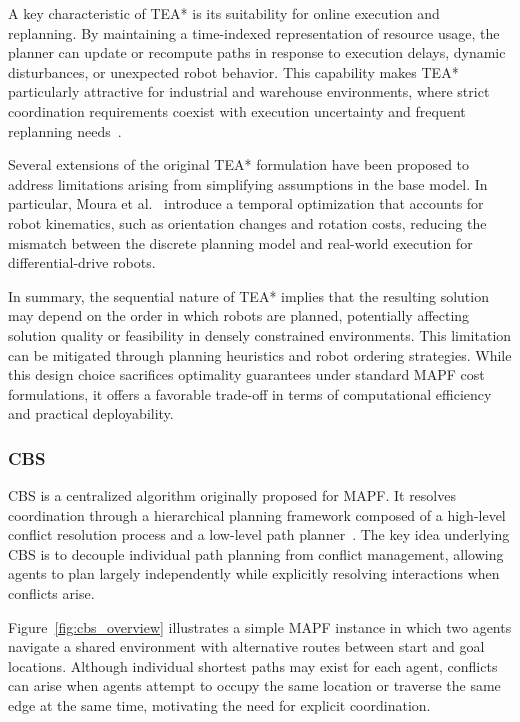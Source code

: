 A key characteristic of TEA* is its suitability for online execution and replanning. By maintaining
a time-indexed representation of resource usage, the planner can update or recompute paths in
response to execution delays, dynamic disturbances, or unexpected robot behavior. This capability
makes TEA* particularly attractive for industrial and warehouse environments, where strict
coordination requirements coexist with execution uncertainty and frequent replanning
needs~\cite{santos2016tea}.

Several extensions of the original TEA* formulation have been proposed to address limitations
arising from simplifying assumptions in the base model. In particular, Moura et
al.~\cite{moura2019temporal} introduce a temporal optimization that accounts for robot kinematics,
such as orientation changes and rotation costs, reducing the mismatch between the discrete planning
model and real-world execution for differential-drive robots.

In summary, the sequential nature of TEA* implies that the resulting solution may depend on the order
in which robots are planned, potentially affecting solution quality or feasibility in densely
constrained environments. This limitation can be mitigated through planning heuristics and robot
ordering strategies. While this design choice sacrifices optimality guarantees under standard MAPF
cost formulations, it offers a favorable trade-off in terms of computational efficiency and
practical deployability.


\subsubsection{CBS}
\label{subsubsec:cbs}
\hspace{\parindent}
CBS is a centralized algorithm originally proposed for MAPF. It resolves
coordination through a hierarchical planning framework composed of a high-level conflict resolution
process and a low-level path planner~\cite{sharon2015conflict}. The key idea underlying CBS is to
decouple individual path planning from conflict management, allowing agents to plan largely
independently while explicitly resolving interactions when conflicts arise.

Figure~\ref{fig:cbs_overview} illustrates a simple MAPF instance in which
two agents navigate a shared environment with alternative routes between start and goal locations.
Although individual shortest paths may exist for each agent, conflicts can arise when agents attempt
to occupy the same location or traverse the same edge at the same time, motivating the need for
explicit coordination.

